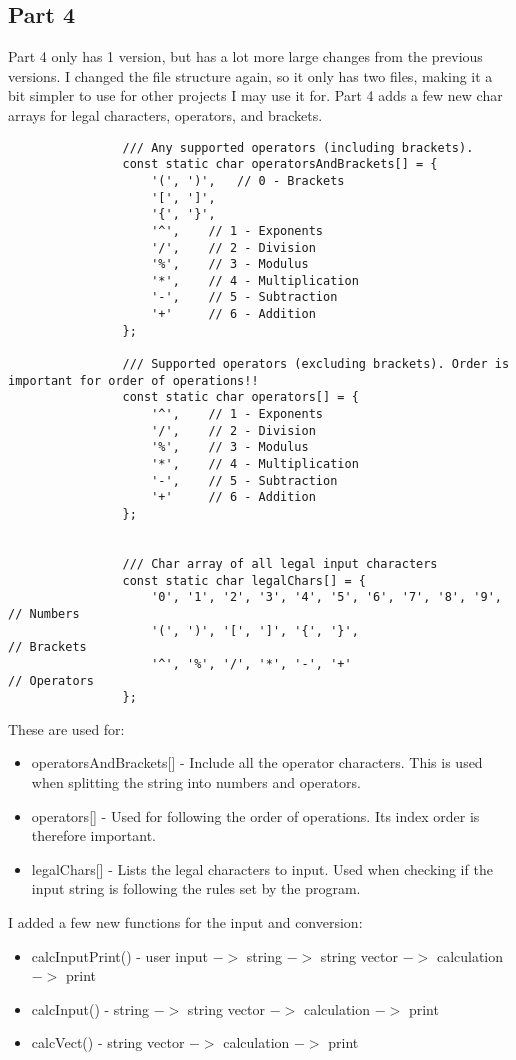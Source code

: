 \documentclass{article}
\begin{document}
		
		\subsection{Part 4}
			Part 4 only has 1 version, but has a lot more large changes from the previous versions. I changed the file structure again, so it only has two files, making it a bit simpler to use for other projects I may use it for.
			Part 4 adds a few new char arrays for legal characters, operators, and brackets.
			\begin{lstlisting}
				/// Any supported operators (including brackets).
				const static char operatorsAndBrackets[] = {
					'(', ')',   // 0 - Brackets
					'[', ']',
					'{', '}',
					'^',    // 1 - Exponents
					'/',    // 2 - Division
					'%',    // 3 - Modulus
					'*',    // 4 - Multiplication
					'-',    // 5 - Subtraction
					'+'     // 6 - Addition
				};
				
				/// Supported operators (excluding brackets). Order is important for order of operations!!
				const static char operators[] = {
					'^',    // 1 - Exponents
					'/',    // 2 - Division
					'%',    // 3 - Modulus
					'*',    // 4 - Multiplication
					'-',    // 5 - Subtraction
					'+'     // 6 - Addition
				};
				
				
				/// Char array of all legal input characters
				const static char legalChars[] = {
					'0', '1', '2', '3', '4', '5', '6', '7', '8', '9',   // Numbers
					'(', ')', '[', ']', '{', '}',                       // Brackets
					'^', '%', '/', '*', '-', '+'                        // Operators
				};
			\end{lstlisting}
			
			These are used for:
			\begin{itemize}
				\item operatorsAndBrackets[] 	- Include all the operator characters. This is used when splitting the string into numbers and operators.
				\item operators[]				- Used for following the order of operations. Its index order is therefore important.
				\item legalChars[]				- Lists the legal characters to input. Used when checking if the input string is following the rules set by the program.
			\end{itemize}
			
			I added a few new functions for the input and conversion:
			\begin{itemize}
				\item calcInputPrint()	- user input $->$ string $->$ string vector $->$ calculation $->$ print
				\item calcInput()		- string $->$ string vector $->$ calculation $->$ print
				\item calcVect()		- string vector $->$ calculation $->$ print
			\end{itemize}
			
\end{document}
